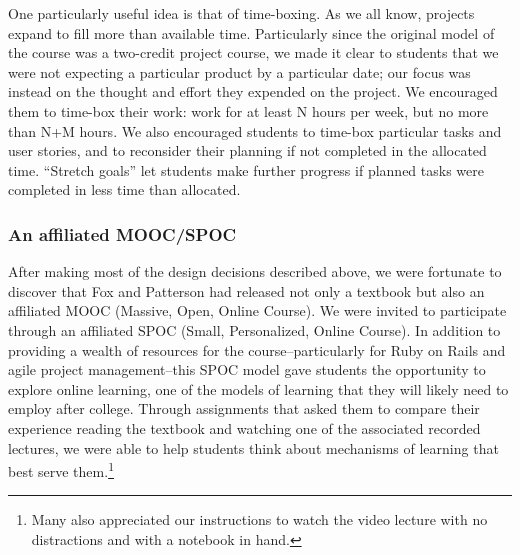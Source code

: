 One particularly useful idea is that of time-boxing.
As we all know, projects expand to fill more than available time.
Particularly since the original model of the course was a two-credit
project course, we made it clear to students that we were not expecting
a particular product by a particular date; our focus was instead on the
thought and effort they expended on the project.  We encouraged them
to time-box their work: work for at least N hours per week, but no more
than N+M hours.  We also encouraged students to time-box particular tasks 
and user stories, and to reconsider their planning if not completed in the 
allocated time.  ``Stretch goals'' let students make further progress 
if planned tasks were completed in less time than allocated.  

\subsubsection{An affiliated MOOC/SPOC}

After making most of the design decisions described above, we were
fortunate to discover that Fox and Patterson had released not only
a textbook \cite{saasbook} but also an affiliated MOOC (Massive,
Open, Online Course).  We were invited to participate through
an affiliated SPOC (Small, Personalized, Online Course).
In addition to providing a wealth of resources for the
course--particularly for Ruby on Rails and agile project management--this
SPOC model gave students the opportunity to explore
online learning, one of the models of learning that they will likely
need to employ after college.  Through assignments that asked them
to compare their experience reading the textbook and watching one
of the associated recorded lectures, we were able to help students
think about mechanisms of learning that best serve them.\footnote{Many also
appreciated our instructions to watch the video lecture with no distractions
and with a notebook in hand.}


%
%
%
%
